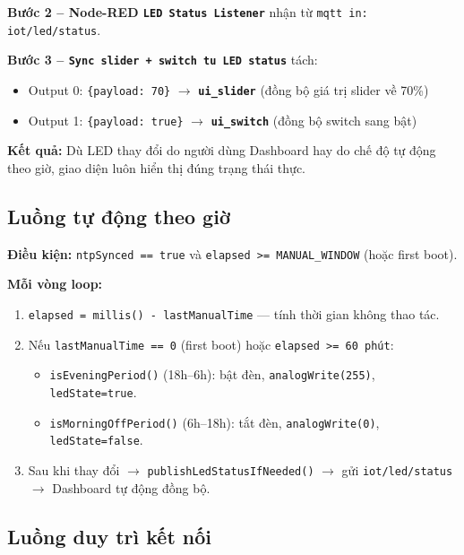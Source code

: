 \documentclass[13pt,a4paper]{article}
\newcommand{\code}[1]{\texttt{#1}}
\begin{document}
\textbf{Bước 2 -- Node-RED \code{LED Status Listener}} nhận từ \code{mqtt in: iot/led/status}.

\textbf{Bước 3 -- \code{Sync slider + switch tu LED status}} tách:
\begin{itemize}
    \item Output 0: \code{\{payload: 70\}} $\rightarrow$ \textbf{\code{ui\_slider}} (đồng bộ giá trị slider về 70\%)
    \item Output 1: \code{\{payload: true\}} $\rightarrow$ \textbf{\code{ui\_switch}} (đồng bộ switch sang bật)
\end{itemize}

\textbf{Kết quả:} Dù LED thay đổi do người dùng Dashboard hay do chế độ tự động theo giờ, giao diện luôn hiển thị đúng trạng thái thực.

\subsection{Luồng tự động theo giờ}
\label{sec:luong4}

\textbf{Điều kiện:} \code{ntpSynced == true} và \code{elapsed >= MANUAL\_WINDOW} (hoặc first boot).

\textbf{Mỗi vòng loop:}

\begin{enumerate}[label=\arabic*., leftmargin=1.5cm]
    \item \code{elapsed = millis() - lastManualTime} --- tính thời gian không thao tác.
    \item Nếu \code{lastManualTime == 0} (first boot) hoặc \code{elapsed >= 60 phút}:
    \begin{itemize}
        \item \code{isEveningPeriod()} (18h--6h): bật đèn, \code{analogWrite(255)}, \code{ledState=true}.
        \item \code{isMorningOffPeriod()} (6h--18h): tắt đèn, \code{analogWrite(0)}, \code{ledState=false}.
    \end{itemize}
    \item Sau khi thay đổi $\rightarrow$ \code{publishLedStatusIfNeeded()} $\rightarrow$ gửi \code{iot/led/status} $\rightarrow$ Dashboard tự động đồng bộ.
\end{enumerate}

\subsection{Luồng duy trì kết nối}
\label{sec:luong5}
\end{document}
